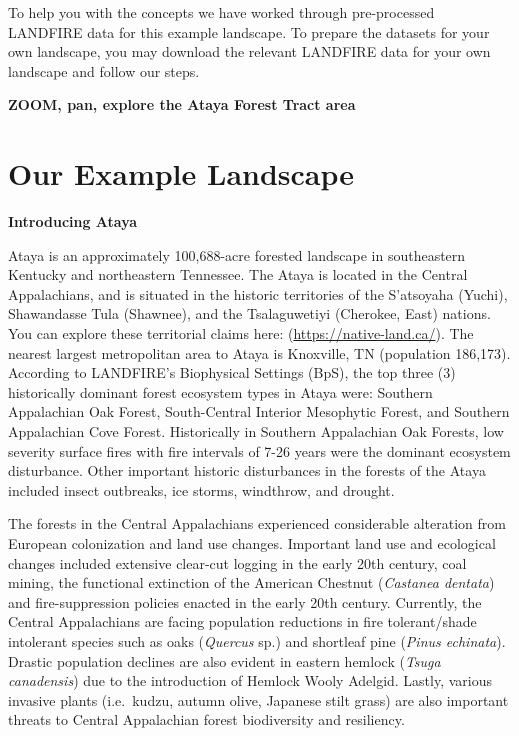 \documentclass[
]{book}
\begin{document}
To help you with the concepts we have worked through pre-processed LANDFIRE data for this example landscape. To prepare the datasets for your own landscape, you may download the relevant LANDFIRE data for your own landscape and follow our steps.

\textbf{ZOOM, pan, explore the Ataya Forest Tract area}

\hypertarget{Ataya}{%
\chapter{Our Example Landscape}\label{Ataya}}

\textbf{Introducing Ataya}

Ataya is an approximately 100,688-acre forested landscape in southeastern Kentucky and northeastern Tennessee. The Ataya is located in the Central Appalachians, and is situated in the historic territories of the S'atsoyaha (Yuchi), Shawandasse Tula (Shawnee), and the Tsalaguwetiyi (Cherokee, East) nations. You can explore these territorial claims here: (\url{https://native-land.ca/}). The nearest largest metropolitan area to Ataya is Knoxville, TN (population 186,173). According to LANDFIRE's Biophysical Settings (BpS), the top three (3) historically dominant forest ecosystem types in Ataya were: Southern Appalachian Oak Forest, South-Central Interior Mesophytic Forest, and Southern Appalachian Cove Forest. Historically in Southern Appalachian Oak Forests, low severity surface fires with fire intervals of 7-26 years were the dominant ecosystem disturbance. Other important historic disturbances in the forests of the Ataya included insect outbreaks, ice storms, windthrow, and drought.

The forests in the Central Appalachians experienced considerable alteration from European colonization and land use changes. Important land use and ecological changes included extensive clear-cut logging in the early 20th century, coal mining, the functional extinction of the American Chestnut (\emph{Castanea dentata}) and fire-suppression policies enacted in the early 20th century. Currently, the Central Appalachians are facing population reductions in fire tolerant/shade intolerant species such as oaks (\emph{Quercus} sp.) and shortleaf pine (\emph{Pinus echinata}). Drastic population declines are also evident in eastern hemlock (\emph{Tsuga canadensis}) due to the introduction of Hemlock Wooly Adelgid. Lastly, various invasive plants (i.e.~kudzu, autumn olive, Japanese stilt grass) are also important threats to Central Appalachian forest biodiversity and resiliency.
\end{document}
